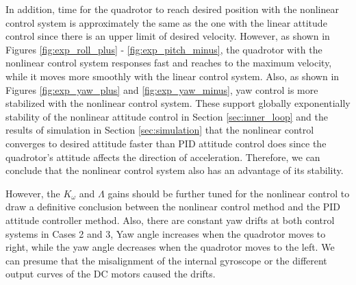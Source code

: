 In addition, time for the quadrotor to reach desired position with the nonlinear control system is approximately the same as the one with the linear attitude control since there is an upper limit of desired velocity. However, as shown in Figures \ref{fig:exp_roll_plus} - \ref{fig:exp_pitch_minus}, the quadrotor with the nonlinear control system responses fast and reaches to the maximum velocity, while it moves more smoothly with the linear control system. Also, as shown in Figures \ref{fig:exp_yaw_plus} and \ref{fig:exp_yaw_minus}, yaw control is more stabilized with the nonlinear control system. These support globally exponentially stability of the nonlinear attitude control in Section \ref{sec:inner_loop} and the results of simulation in Section \ref{sec:simulation} that the nonlinear control converges to desired attitude faster than PID attitude control does since the quadrotor's attitude affects the direction of acceleration. Therefore, we can conclude that the nonlinear control system also has an advantage of its stability.

However, the \(K_{\omega}\) and \(\Lambda\) gains should be further tuned for the nonlinear control to draw a definitive conclusion between the nonlinear control method and the PID attitude controller method. Also, there are constant yaw drifts at both control systems in Cases 2 and 3, Yaw angle increases when the quadrotor moves to right, while the yaw angle decreases when the quadrotor moves to the left. We can presume that the misalignment of the internal gyroscope or the different output curves of the DC motors caused the drifts.